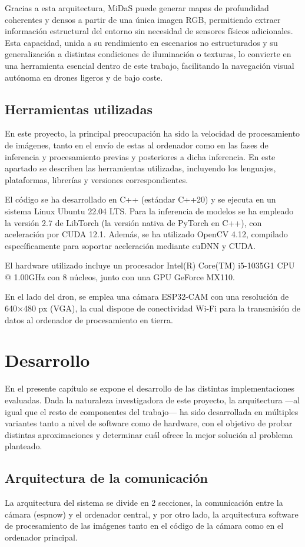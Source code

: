 Gracias a esta arquitectura, MiDaS puede generar mapas de profundidad coherentes y densos a partir de una única imagen RGB, permitiendo extraer información estructural del entorno sin necesidad de sensores físicos adicionales. Esta capacidad, unida a su rendimiento en escenarios no estructurados y su generalización a distintas condiciones de iluminación o texturas, lo convierte en una herramienta esencial dentro de este trabajo, facilitando la navegación visual autónoma en drones ligeros y de bajo coste.

    \section{Herramientas utilizadas}
En este proyecto, la principal preocupación ha sido la velocidad de procesamiento de imágenes, tanto en el envío de estas al ordenador como en las fases de inferencia y procesamiento previas y posteriores a dicha inferencia. En este apartado se describen las herramientas utilizadas, incluyendo los lenguajes, plataformas, librerías y versiones correspondientes.

El código se ha desarrollado en C++ (estándar C++20) y se ejecuta en un sistema Linux Ubuntu 22.04 LTS. Para la inferencia de modelos se ha empleado la versión 2.7 de LibTorch (la versión nativa de PyTorch en C++), con aceleración por CUDA 12.1. Además, se ha utilizado OpenCV 4.12, compilado específicamente para soportar aceleración mediante cuDNN y CUDA.

El hardware utilizado incluye un procesador Intel(R) Core(TM) i5-1035G1 CPU @ 1.00GHz con 8 núcleos, junto con una GPU GeForce MX110.

En el lado del dron, se emplea una cámara ESP32-CAM con una resolución de 640×480 px (VGA), la cual dispone de conectividad Wi-Fi para la transmisión de datos al ordenador de procesamiento en tierra.

  \chapter{Desarrollo}
En el presente capítulo se expone el desarrollo de las distintas implementaciones evaluadas. Dada la naturaleza investigadora de este proyecto, la arquitectura —al igual que el resto de componentes del trabajo— ha sido desarrollada en múltiples variantes tanto a nivel de software como de hardware, con el objetivo de probar distintas aproximaciones y determinar cuál ofrece la mejor solución al problema planteado.
    \section{Arquitectura de la comunicación}
La arquitectura del sistema se divide en 2 secciones, la comunicación entre la cámara (espnow) y el ordenador central, y por otro lado, la arquitectura software de procesamiento de las imágenes tanto en el código de la cámara como en el ordenador principal.

